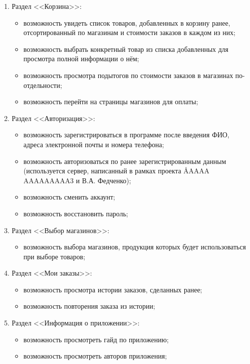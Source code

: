\documentclass[a4paper,12pt]{article}
\begin{document}
\begin{enumerate}
    \item Раздел <<Корзина>>:
    \begin{itemize}
      \item возможность увидеть список товаров, добавленных в корзину ранее, отсортированный по магазинам и стоимости заказов в каждом из них;
      \item возможность выбрать конкретный товар из списка добавленных для просмотра полной информации о нём;
      \item возможность просмотра подытогов по стоимости заказов в магазинах по-отдельности;
      \item возможность перейти на страницы магазинов для оплаты;
    \end{itemize}
    \item Раздел <<Авторизация>>:
    \begin{itemize}
      \item возможность зарегистрироваться в программе после введения ФИО, адреса электронной почты и номера телефона;
      \item возможность авторизоваться по ранее зарегистрированным данным (используется сервер, написанный в рамках проекта \AA{AAAA AAAAAAAAA}{3} и В.А. Федченко);
      \item возможность сменить аккаунт;
      \item возможность восстановить пароль;
    \end{itemize}
    \item Раздел <<Выбор магазинов>>:
    \begin{itemize}
      \item возможность выбора магазинов, продукция которых будет использоваться при выборе товаров;
    \end{itemize}
    \item Раздел <<Мои заказы>>:
    \begin{itemize}
      \item возможность просмотра истории заказов, сделанных ранее;
      \item возможность повторения заказа из истории;
    \end{itemize}
    \item Раздел <<Информация о приложении>>:
    \begin{itemize}
      \item возможность просмотреть гайд по приложению;
      \item возможность просмотреть авторов приложения;
    \end{itemize}
  \end{enumerate}
\end{document}
